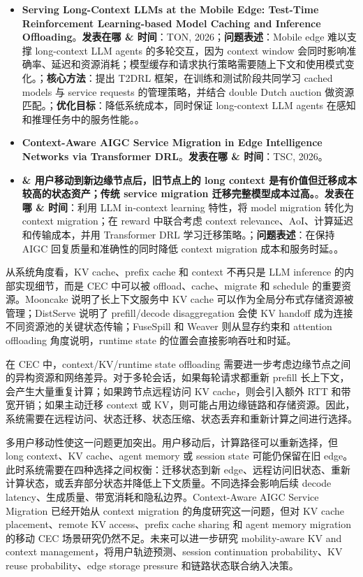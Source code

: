 \documentclass[a4paper,twocolumn,10pt]{ctexart}
\begin{document}
\begin{itemize}
\item \textbf{Serving Long-Context LLMs at the Mobile Edge: Test-Time Reinforcement Learning-based Model Caching and Inference Offloading}。\textbf{发表在哪 \& 时间}：TON, 2026；\textbf{问题表述}：Mobile edge 难以支撑 long-context LLM agents 的多轮交互，因为 context window 会同时影响准确率、延迟和资源消耗；模型缓存和请求执行策略需要随上下文和使用模式变化。；\textbf{核心方法}：提出 T2DRL 框架，在训练和测试阶段共同学习 cached models 与 service requests 的管理策略，并结合 double Dutch auction 做资源匹配。；\textbf{优化目标}：降低系统成本，同时保证 long-context LLM agents 在感知和推理任务中的服务性能。。
\item \textbf{Context-Aware AIGC Service Migration in Edge Intelligence Networks via Transformer DRL}。\textbf{发表在哪 \& 时间}：TSC, 2026。
\item \textbf{\& 用户移动到新边缘节点后，旧节点上的 long context 是有价值但迁移成本较高的状态资产；传统 service migration 迁移完整模型成本过高。}。\textbf{发表在哪 \& 时间}：利用 LLM in-context learning 特性，将 model migration 转化为 context migration；在 reward 中联合考虑 context relevance、AoI、计算延迟和传输成本，并用 Transformer DRL 学习迁移策略。；\textbf{问题表述}：在保持 AIGC 回复质量和准确性的同时降低 context migration 成本和服务时延。。
\end{itemize}



从系统角度看，KV cache、prefix cache 和 context 不再只是 LLM inference 的内部实现细节，而是 CEC 中可以被 offload、cache、migrate 和 schedule 的重要资源。Mooncake 说明了长上下文服务中 KV cache 可以作为全局分布式存储资源被管理；DistServe 说明了 prefill/decode disaggregation 会使 KV handoff 成为连接不同资源池的关键状态传输；FuseSpill 和 Weaver 则从显存约束和 attention offloading 角度说明，runtime state 的位置会直接影响吞吐和时延。


在 CEC 中，context/KV/runtime state offloading 需要进一步考虑边缘节点之间的异构资源和网络差异。对于多轮会话，如果每轮请求都重新 prefill 长上下文，会产生大量重复计算；如果跨节点远程访问 KV cache，则会引入额外 RTT 和带宽开销；如果主动迁移 context 或 KV，则可能占用边缘链路和存储资源。因此，系统需要在远程访问、状态迁移、状态压缩、状态丢弃和重新计算之间进行选择。


多用户移动性使这一问题更加突出。用户移动后，计算路径可以重新选择，但 long context、KV cache、agent memory 或 session state 可能仍保留在旧 edge。此时系统需要在四种选择之间权衡：迁移状态到新 edge、远程访问旧状态、重新计算状态，或丢弃部分状态并降低上下文质量。不同选择会影响后续 decode latency、生成质量、带宽消耗和隐私边界。Context-Aware AIGC Service Migration 已经开始从 context migration 的角度研究这一问题，但对 KV cache placement、remote KV access、prefix cache sharing 和 agent memory migration 的移动 CEC 场景研究仍然不足。未来可以进一步研究 mobility-aware KV and context management，将用户轨迹预测、session continuation probability、KV reuse probability、edge storage pressure 和链路状态联合纳入决策。
\end{document}
